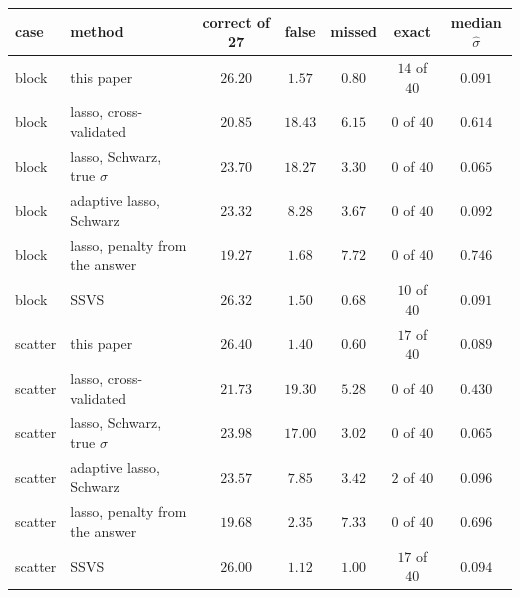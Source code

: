 \begin{center}
\footnotesize
\begin{tabular}{llccccc}
case & method & correct of 27 & false & missed & exact & median $\hat\sigma$ \\
\hline
block & this paper & $26.20$ & $1.57$ & $0.80$ & $14$ of $40$ & $0.091$ \\
block & lasso, cross-validated & $20.85$ & $18.43$ & $6.15$ & $0$ of $40$ & $0.614$ \\
block & lasso, Schwarz, true $\sigma$ & $23.70$ & $18.27$ & $3.30$ & $0$ of $40$ & $0.065$ \\
block & adaptive lasso, Schwarz & $23.32$ & $8.28$ & $3.67$ & $0$ of $40$ & $0.092$ \\
block & lasso, penalty from the answer & $19.27$ & $1.68$ & $7.72$ & $0$ of $40$ & $0.746$ \\
block & SSVS & $26.32$ & $1.50$ & $0.68$ & $10$ of $40$ & $0.091$ \\
\hline
scatter & this paper & $26.40$ & $1.40$ & $0.60$ & $17$ of $40$ & $0.089$ \\
scatter & lasso, cross-validated & $21.73$ & $19.30$ & $5.28$ & $0$ of $40$ & $0.430$ \\
scatter & lasso, Schwarz, true $\sigma$ & $23.98$ & $17.00$ & $3.02$ & $0$ of $40$ & $0.065$ \\
scatter & adaptive lasso, Schwarz & $23.57$ & $7.85$ & $3.42$ & $2$ of $40$ & $0.096$ \\
scatter & lasso, penalty from the answer & $19.68$ & $2.35$ & $7.33$ & $0$ of $40$ & $0.696$ \\
scatter & SSVS & $26.00$ & $1.12$ & $1.00$ & $17$ of $40$ & $0.094$ \\
\end{tabular}
\end{center}
